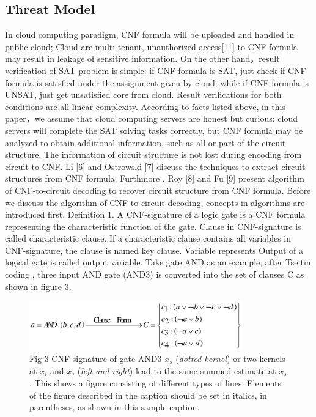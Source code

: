 \documentclass[runningheads,a4paper]{llncs}
\begin{document}
\subsection{Threat Model}
In cloud computing paradigm, CNF formula will be uploaded and handled in public cloud; Cloud are multi-tenant, unauthorized access[11] to CNF formula may result in leakage of sensitive information.
\newline On the other hand，result verification of SAT problem is simple: if CNF formula is SAT, just check if CNF formula is satisfied under the assignment given by cloud; while if CNF formula is UNSAT, just get unsatisfied core from cloud. Result verifications for both conditions are all linear complexity.
\newline According to facts listed above, in this paper，we assume that cloud computing servers are honest but curious: cloud servers will complete the SAT solving tasks correctly, but CNF formula may be analyzed to obtain additional information, such as all or part of the circuit structure.
\newline The information of circuit structure is not lost during encoding from circuit to CNF. Li [6] and Ostrowski [7] discuss the techniques to extract circuit structures from CNF formula. Furthmore , Roy [8] and Fu [9]  present algorithm of CNF-to-circuit decoding to recover circuit structure from CNF formula.
\newline Before we discuss the algorithm of CNF-to-circuit decoding, concepts in algorithms are introduced first.  
\newline Definition 1. A CNF-signature of a logic gate is a CNF formula representing the characteristic function of the gate. Clause in CNF-signature is called characteristic clause. If a characteristic clause contains all variables in CNF-signature, the clause is named key clause. Variable represents Output of a logical gate is called output variable.
\newline Take gate AND as an example, after Tseitin coding , three input AND gate (AND3) is converted into the set of clauses C as shown in figure 3.

\begin{figure}
\centering
\includegraphics[width=9.2cm]{a3}
\caption{Fig 3 CNF signature of gate AND3  $x_s$ (\emph{dotted kernel}) or two kernels at
$x_i$ and $x_j$ (\textit{left and right}) lead to the same summed estimate
at $x_s$. This shows a figure consisting of different types of
lines. Elements of the figure described in the caption should be set in
italics, in parentheses, as shown in this sample caption.}
\label{fig:example}
\end{figure}
\end{document}
